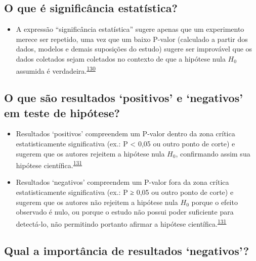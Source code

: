 \documentclass[
  a4paper,
]{book}
\providecommand{\tightlist}{%
  \setlength{\itemsep}{0pt}\setlength{\parskip}{0pt}}
\begin{document}
\hypertarget{o-que-uxe9-significuxe2ncia-estatuxedstica}{%
\subsection{O que é significância estatística?}\label{o-que-uxe9-significuxe2ncia-estatuxedstica}}

\begin{itemize}
\tightlist
\item
  A expressão ``significância estatística'' sugere apenas que um experimento merece ser repetido, uma vez que um baixo P-valor (calculado a partir dos dados, modelos e demais suposições do estudo) sugere ser improvável que os dados coletados sejam coletados no contexto de que a hipótese nula \(H_{0}\) assumida é verdadeira.\textsuperscript{\protect\hyperlink{ref-aylmerfisher1926}{130}}
\end{itemize}

\hypertarget{o-que-suxe3o-resultados-positivos-e-negativos-em-teste-de-hipuxf3tese}{%
\subsection{O que são resultados `positivos' e `negativos' em teste de hipótese?}\label{o-que-suxe3o-resultados-positivos-e-negativos-em-teste-de-hipuxf3tese}}

\begin{itemize}
\item
  Resultados `positivos' compreendem um P-valor dentro da zona crítica estatisticamente significativa (ex.: P \textless{} 0,05 ou outro ponto de corte) e sugerem que os autores rejeitem a hipótese nula \(H_{0}\), confirmando assim sua hipótese científica.\textsuperscript{\protect\hyperlink{ref-greenhalgh1997a}{131}}
\item
  Resultados `negativos' compreendem um P-valor fora da zona crítica estatisticamente significativa (ex.: P ≥ 0,05 ou outro ponto de corte) e sugerem que os autores não rejeitem a hipótese nula \(H_{0}\) porque o efeito observado é nulo, ou porque o estudo não possui poder suficiente para detectá-lo, não permitindo portanto afirmar a hipótese científica.\textsuperscript{\protect\hyperlink{ref-greenhalgh1997a}{131}}
\end{itemize}

\hypertarget{qual-a-importuxe2ncia-de-resultados-negativos}{%
\subsection{Qual a importância de resultados `negativos'?}\label{qual-a-importuxe2ncia-de-resultados-negativos}}
\end{document}
